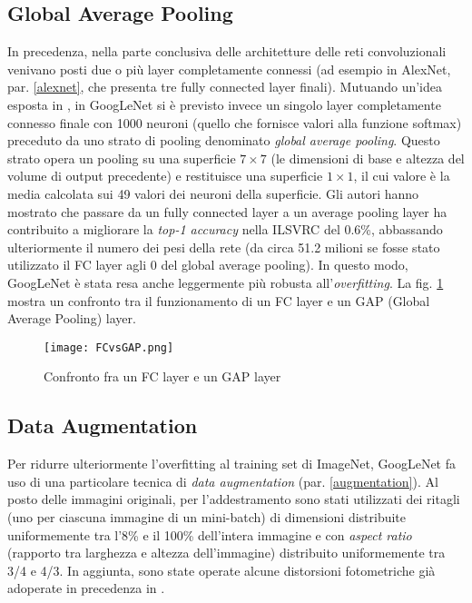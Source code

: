 \subsection{Global Average Pooling}
\label{globalAveragePooling}
In precedenza, nella parte conclusiva delle architetture delle reti convoluzionali venivano posti due o più layer completamente connessi (ad esempio in AlexNet, par. \ref{alexnet}, che presenta tre fully connected layer finali).
Mutuando un'idea esposta in \cite{NiN}, in GoogLeNet si è previsto invece un singolo layer completamente connesso finale con 1000 neuroni (quello che fornisce valori alla funzione softmax) preceduto da uno strato di pooling denominato \textit{global average pooling}. Questo strato opera un pooling su una superficie $7\times 7$ (le dimensioni di base e altezza del volume di output precedente) e restituisce una superficie $1\times 1$, il cui valore è la media calcolata sui 49 valori dei neuroni della superficie. Gli autori hanno mostrato che passare da un fully connected layer a un average pooling layer ha contribuito a migliorare la \textit{top-1 accuracy} nella ILSVRC del 0.6\%, abbassando ulteriormente il numero dei pesi della rete (da circa 51.2 milioni se fosse stato utilizzato il FC layer agli 0 del global average pooling). In questo modo, GoogLeNet è stata resa anche leggermente più robusta all'\textit{overfitting}.
La fig. \ref{fig:FCvsGAP} mostra un confronto tra il funzionamento di un FC layer e un GAP (Global Average Pooling) layer.

\begin{figure}[h]
\centering
\texttt{[image: FCvsGAP.png]}
\caption{Confronto fra un FC layer e un GAP layer}
\label{fig:FCvsGAP}
\end{figure}

\subsection{Data Augmentation}
\label{googlenetAugmentation}
Per ridurre ulteriormente l'overfitting al training set di ImageNet, GoogLeNet fa uso di una particolare tecnica di \textit{data augmentation} (par. \ref{augmentation}). Al posto delle immagini originali, per l'addestramento sono stati utilizzati dei ritagli (uno per ciascuna immagine di un mini-batch) di dimensioni distribuite uniformemente tra l'8\% e il 100\% dell'intera immagine e con \textit{aspect ratio} (rapporto tra larghezza e altezza dell'immagine) distribuito uniformemente tra 3/4 e 4/3. In aggiunta, sono state operate alcune distorsioni fotometriche già adoperate in precedenza in \cite{photometric}.

